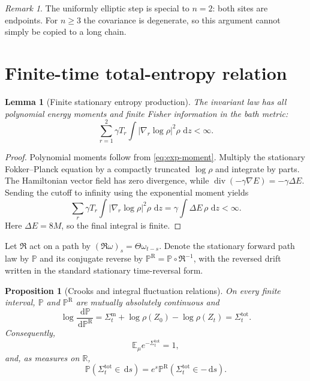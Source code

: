 \documentclass[11pt]{article}
\newtheorem{proposition}[theorem]{Proposition}
\newtheorem{lemma}[theorem]{Lemma}
\theoremstyle{remark}
\newtheorem{remark}[theorem]{Remark}
\newcommand{\R}{\mathbb R}
\newcommand{\E}{\mathbb E}
\newcommand{\dd}{\,\mathrm d}
\newcommand{\SigmaM}{\Sigma^{\mathrm m}}
\newcommand{\SigmaT}{\Sigma^{\mathrm{tot}}}
\begin{document}
\begin{remark}
The uniformly elliptic step is special to $n=2$: both sites are endpoints.
For $n\ge3$ the covariance is degenerate, so this argument cannot simply be
copied to a long chain.
\end{remark}

\section{Finite-time total-entropy relation}

\begin{lemma}[Finite stationary entropy production]\label{lem:fisher}
The invariant law has all polynomial energy moments and finite Fisher
information in the bath metric:
\begin{equation}\label{eq:fisher}
 \sum_{r=1}^2\gamma T_r
 \int |\nabla_r\log\rho|^2\rho\,\dd z<\infty.
\end{equation}
\end{lemma}

\begin{proof}
Polynomial moments follow from \eqref{eq:exp-moment}.  Multiply the stationary
Fokker--Planck equation by a compactly truncated $\log\rho$ and integrate by
parts.  The Hamiltonian vector field has zero divergence, while
$\operatorname{div}(-\gamma\nabla E)=-\gamma\Delta E$.  Sending the cutoff
to infinity using the exponential moment yields
\[
 \sum_r\gamma T_r\int|\nabla_r\log\rho|^2\rho\,\dd z
 =\gamma\int\Delta E\,\rho\,\dd z<\infty.
\]
Here $\Delta E=8M$, so the final integral is finite.
\end{proof}

Let $\mathfrak R$ act on a path by
$(\mathfrak R\omega)_s=\Theta\omega_{t-s}$.  Denote the stationary forward
path law by $\mathbb P$ and its conjugate reverse by
$\mathbb P^{\mathrm R}=\mathbb P\circ\mathfrak R^{-1}$, with the reversed
drift written in the standard stationary time-reversal form.

\begin{proposition}[Crooks and integral fluctuation relations]\label{prop:path-ft}
On every finite interval, $\mathbb P$ and $\mathbb P^{\mathrm R}$ are mutually
absolutely continuous and
\begin{equation}\label{eq:RN}
 \log\frac{\dd\mathbb P}{\dd\mathbb P^{\mathrm R}}
 =\SigmaM_t+\log\rho(Z_0)-\log\rho(Z_t)=\SigmaT_t.
\end{equation}
Consequently,
\begin{equation}\label{eq:IFT}
 \E_\mu e^{-\SigmaT_t}=1,
\end{equation}
and, as measures on $\R$,
\begin{equation}\label{eq:Crooks}
 \mathbb P(\SigmaT_t\in\dd s)
 =e^s\mathbb P^{\mathrm R}(\SigmaT_t\in-\dd s).
\end{equation}
\end{proposition}
\end{document}
